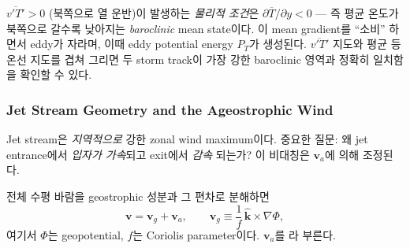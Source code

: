 
\begin{remark}
$\overline{v'T'} > 0$ (북쪽으로 열 운반)이 발생하는 \textit{물리적 조건}은
$\partial \overline{T}/\partial y < 0$ — 즉 평균 온도가 북쪽으로 갈수록
낮아지는 \textit{baroclinic} mean state이다.  이 mean gradient를 ``소비''
하면서 eddy가 자라며, 이때 eddy potential energy $P_T$가 생성된다.
$\overline{v'T'}$ 지도와 평균 등온선 지도를 겹쳐 그리면 두 storm track이
가장 강한 baroclinic 영역과 정확히 일치함을 확인할 수 있다.
\end{remark}

\subsubsection{Jet Stream Geometry and the Ageostrophic Wind}

Jet stream은 \textit{지역적으로} 강한 zonal wind maximum이다.  중요한
질문: 왜 jet entrance에서 \textit{입자가 가속}되고 exit에서 \textit{감속}
되는가?  이 비대칭은  $\mathbf{v}_a$에 의해
조정된다.

\begin{definition}
전체 수평 바람을 geostrophic 성분과 그 편차로 분해하면
\begin{equation}\label{eq:ch06_nh_ageo_def}
  \mathbf{v} = \mathbf{v}_g + \mathbf{v}_a,\qquad
  \mathbf{v}_g \equiv \frac{1}{f}\,\hat{\mathbf{k}}\times\nabla\Phi,
\end{equation}
여기서 $\Phi$는 geopotential, $f$는 Coriolis parameter이다.
$\mathbf{v}_a$를 라 부른다.
\end{definition}


